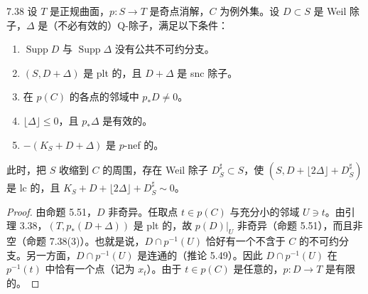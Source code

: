 \begin{propositionp}{7.38}
设 $T$ 是正规曲面，$p\colon S\to T$ 是奇点消解，$C$ 为例外集。设 $D\subset S$ 是 Weil 除子，$\Delta$ 是（不必有效的）Q-除子，满足以下条件：
\begin{enumerate}[label=(\arabic*),leftmargin=2.4em,itemsep=1pt,topsep=2pt,parsep=0pt]
\item $\operatorname{Supp}D$ 与 $\operatorname{Supp}\Delta$ 没有公共不可约分支。
\item $(S,D+\Delta)$ 是 plt 的，且 $D+\Delta$ 是 snc 除子。
\item 在 $p(C)$ 的各点的邻域中 $p_*D\ne0$。
\item $\lfloor\Delta\rfloor\le0$，且 $p_*\Delta$ 是有效的。
\item $-(K_S+D+\Delta)$ 是 $p$-nef 的。
\end{enumerate}
此时，把 $S$ 收缩到 $C$ 的周围，存在 Weil 除子 $D^\sharp_S\subset S$，使 $(S,D+\lfloor 2\Delta\rfloor+D^\sharp_S)$ 是 lc 的，且 $K_S+D+\lfloor 2\Delta\rfloor+D^\sharp_S\sim0$。
\end{propositionp}

\begin{proof}
由命题 5.51，$D$ 非奇异。任取点 $t\in p(C)$ 与充分小的邻域 $U\ni t$。由引理 3.38，$(T,p_*(D+\Delta))$ 是 plt 的，故 $p(D)|_U$ 非奇异（命题 5.51），而且非空（命题 7.38(3)）。也就是说，$D\cap p^{-1}(U)$ 恰好有一个不含于 $C$ 的不可约分支。另一方面，$D\cap p^{-1}(U)$ 是连通的（推论 5.49）。因此 $D\cap p^{-1}(U)$ 在 $p^{-1}(t)$ 中恰有一个点（记为 $x_t$）。由于 $t\in p(C)$ 是任意的，$p\colon D\to T$ 是有限的。
\end{proof}